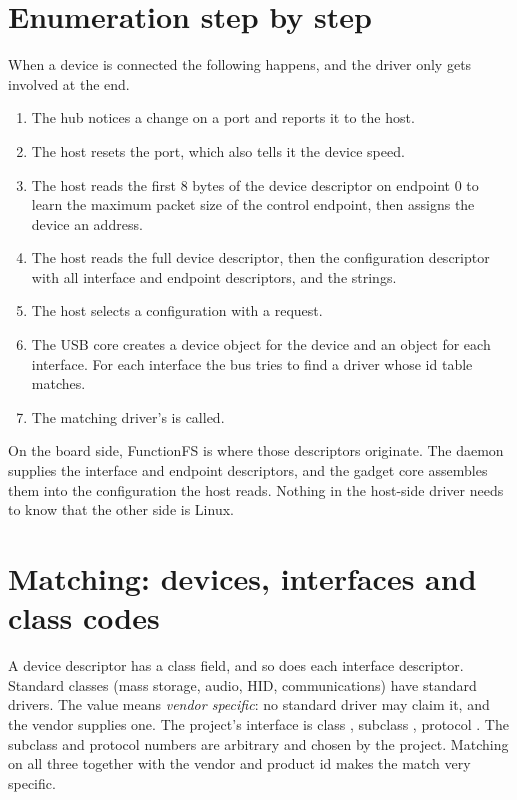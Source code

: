 \section{Enumeration step by step}

When a device is connected the following happens, and the driver only gets involved at the end.

\begin{enumerate}
  \item The hub notices a change on a port and reports it to the host.
  \item The host resets the port, which also tells it the device speed.
  \item The host reads the first 8 bytes of the device descriptor on endpoint 0 to learn the maximum packet size of the control endpoint, then assigns the device an address.
  \item The host reads the full device descriptor, then the configuration descriptor with all interface and endpoint descriptors, and the strings.
  \item The host selects a configuration with a  request.
  \item The USB core creates a device object for the device and an object for each interface. For each interface the bus tries to find a driver whose id table matches.
  \item The matching driver's  is called.
\end{enumerate}

On the board side, FunctionFS is where those descriptors originate. The daemon supplies the interface and endpoint descriptors, and the gadget core assembles them into the configuration the host reads. Nothing in the host-side driver needs to know that the other side is Linux.

\section{Matching: devices, interfaces and class codes}

A device descriptor has a class field, and so does each interface descriptor. Standard classes (mass storage, audio, HID, communications) have standard drivers. The value  means \emph{vendor specific}: no standard driver may claim it, and the vendor supplies one. The project's interface is class , subclass , protocol . The subclass and protocol numbers are arbitrary and chosen by the project. Matching on all three together with the vendor and product id makes the match very specific.

